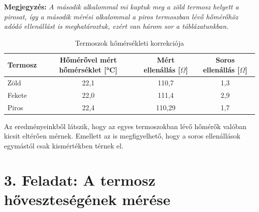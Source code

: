 \documentclass{article}
\renewenvironment{leftbar}{%
  \def\FrameCommand{\textcolor{orange}{\vrule width 3pt} \hspace{10pt}}%
  \MakeFramed {\advance\hsize-\width \FrameRestore}}%
 {\endMakeFramed}
\begin{document}
\begin{leftbar}
\textbf{Megjegyzés:} \textit{A második alkalommal mi kaptuk meg a zöld termosz helyett a pirosat, így a második mérési alkalommal a piros termoszban lévő hőmérőhöz adódó ellenállást is meghatároztuk, ezért van három sor a táblázatunkban.}
\end{leftbar}

\begin{table}[H]
    \centering
    \renewcommand{\arraystretch}{1.2}
    \begin{tabular}{|l|c|c|c|}
        \hline
        Termosz & Hőmérővel mért hőmérséklet [°C] & Mért ellenállás [$\Omega$] & Soros ellenállás [$\Omega$] \\ \hline
        Zöld & 22,1 & 110,7 & 1,3 \\ \hline
        Fekete & 22,0 & 111,4 & 2,9 \\ \hline
        Piros & 22,4 & 110,29 & 1,7 \\ \hline
    \end{tabular}
    \caption{Termoszok hőmérsékleti korrekciója}
    \label{tab:hotan_2}
\end{table}

Az eredményeinkből látszik, hogy az egyes termoszokban lévő hőmérők valóban kicsit eltérően mérnek. Emellett az is megfigyelhető, hogy a soros ellenállások egymástól csak kismértékben térnek el.


\section*{3. Feladat: A termosz hőveszteségének mérése}
\end{document}

